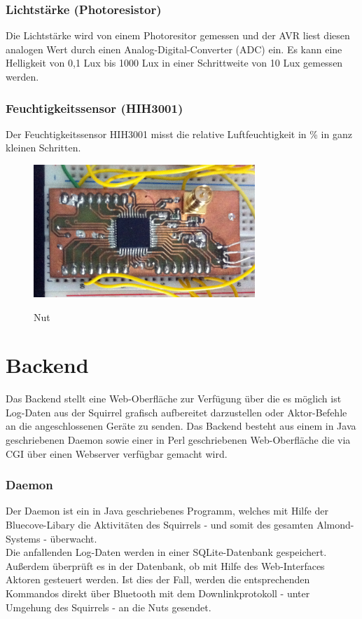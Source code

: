 \documentclass[12pt,a4paper]{article}
\begin{document}
		\subsubsection{Lichtstärke (Photoresistor)}
		Die Lichtstärke wird von einem Photoresitor gemessen und der AVR liest diesen analogen Wert durch einen Analog-Digital-Converter (ADC) ein. Es kann eine Helligkeit von 0,1 Lux bis 1000 Lux in einer Schrittweite von 10 Lux gemessen werden.
		\subsubsection{Feuchtigkeitssensor (HIH3001)}
		Der Feuchtigkeitssensor HIH3001 misst die relative Luftfeuchtigkeit in \% in ganz kleinen Schritten. 

		\begin{figure}[h]
		\includegraphics[height=5cm]{nut_shot1.png} 
		\label{fig:2}
		\caption{Nut}
		\end{figure}

		
\section{Backend}
Das Backend stellt eine Web-Oberfläche zur Verfügung über die es möglich ist Log-Daten aus der Squirrel grafisch aufbereitet darzustellen oder Aktor-Befehle an die angeschlossenen Geräte zu senden. Das Backend besteht aus einem in Java geschriebenen Daemon sowie einer in Perl geschriebenen Web-Oberfläche die via CGI über einen Webserver verfügbar gemacht wird.

\subsubsection{Daemon}
Der Daemon ist ein in Java geschriebenes Programm, welches mit Hilfe der Bluecove-Libary die Aktivitäten des Squirrels - und somit des gesamten Almond-Systems - überwacht.\\
Die anfallenden Log-Daten werden in einer SQLite-Datenbank gespeichert.\\
Außerdem überprüft es in der Datenbank, ob mit Hilfe des Web-Interfaces Aktoren gesteuert werden. Ist dies der Fall, werden die entsprechenden Kommandos direkt über Bluetooth mit dem Downlinkprotokoll - unter Umgehung des Squirrels - an die Nuts gesendet.\\
\end{document}
